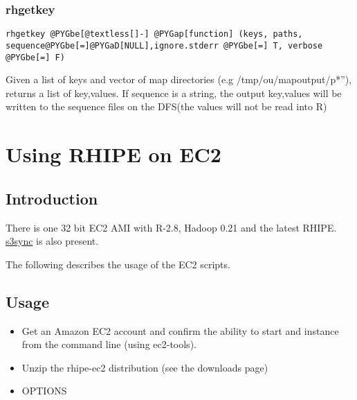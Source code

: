 \documentclass[letterpaper,10pt,english]{manual}
\begin{document}
\subsection{rhgetkey}

\begin{Verbatim}[commandchars=@\[\]]
rhgetkey @PYGbe[@textless[]-] @PYGap[function] (keys, paths, sequence@PYGbe[=]@PYGaD[NULL],ignore.stderr @PYGbe[=] T, verbose @PYGbe[=] F)
\end{Verbatim}

Given a list of keys and vector of  map directories (e.g /tmp/ou/mapoutput/p*''),
returns a list of key,values. If sequence is a string, the output key,values will be written to the sequence files on the DFS(the values will not be read into R)

\resetcurrentobjects
\hypertarget{--doc-ec2}{}

\chapter{Using RHIPE on EC2}


\section{Introduction}

There is one 32 bit EC2 AMI with R-2.8, Hadoop 0.21 and the latest RHIPE. \href{http://s3sync.net/wiki}{s3sync} is also present.

The following describes the usage of the EC2 scripts.


\section{Usage}
\begin{itemize}
\item {} 
Get an Amazon EC2 account and confirm the ability to start and instance from the command line (using ec2-tools).

\item {} 
Unzip the rhipe-ec2 distribution (see the downloads page)

\item {} 
OPTIONS

\end{itemize}
\end{document}
